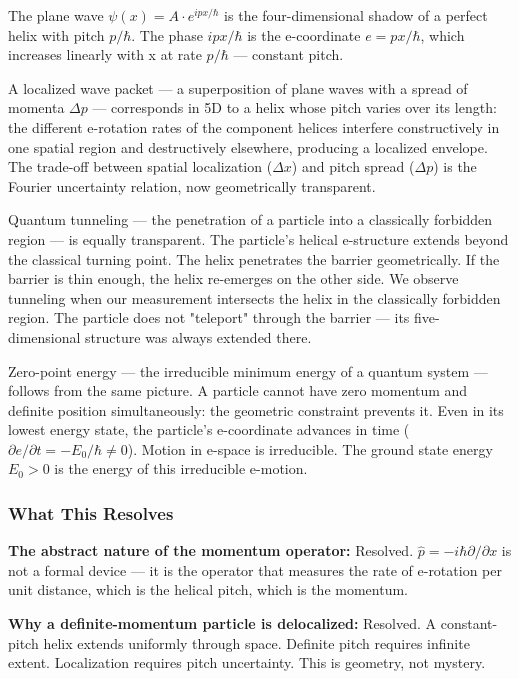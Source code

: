 \documentclass[aps,prd,preprint,superscriptaddress,longbibliography,floatfix]{revtex4-2}
\theoremstyle{remark}
\begin{document}
The plane wave $\psi(x) = A \cdot e^{ipx/\hbar}$ is the four-dimensional shadow of a perfect helix with pitch $p/\hbar$. The phase $ipx/\hbar$ is the e-coordinate $e = px/\hbar$, which increases linearly with x at rate $p/\hbar$ --- constant pitch.

A localized wave packet --- a superposition of plane waves with a spread of momenta $\Delta p$ --- corresponds in 5D to a helix whose pitch varies over its length: the different e-rotation rates of the component helices interfere constructively in one spatial region and destructively elsewhere, producing a localized envelope. The trade-off between spatial localization ($\Delta x$) and pitch spread ($\Delta p$) is the Fourier uncertainty relation, now geometrically transparent.

Quantum tunneling --- the penetration of a particle into a classically forbidden region --- is equally transparent. The particle's helical e-structure extends beyond the classical turning point. The helix penetrates the barrier geometrically. If the barrier is thin enough, the helix re-emerges on the other side. We observe tunneling when our measurement intersects the helix in the classically forbidden region. The particle does not "teleport" through the barrier --- its five-dimensional structure was always extended there.

Zero-point energy --- the irreducible minimum energy of a quantum system --- follows from the same picture. A particle cannot have zero momentum and definite position simultaneously: the geometric constraint prevents it. Even in its lowest energy state, the particle's e-coordinate advances in time ($\partial e/\partial t = -E_{0}/\hbar \neq 0$). Motion in e-space is irreducible. The ground state energy $E_{0} > 0$ is the energy of this irreducible e-motion.


\subsubsection{What This Resolves}

\textbf{The abstract nature of the momentum operator:} Resolved. $\hat{p} = -i\hbar \partial/\partial x$ is not a formal device --- it is the operator that measures the rate of e-rotation per unit distance, which is the helical pitch, which is the momentum.

\textbf{Why a definite-momentum particle is delocalized:} Resolved. A constant-pitch helix extends uniformly through space. Definite pitch requires infinite extent. Localization requires pitch uncertainty. This is geometry, not mystery.
\end{document}
